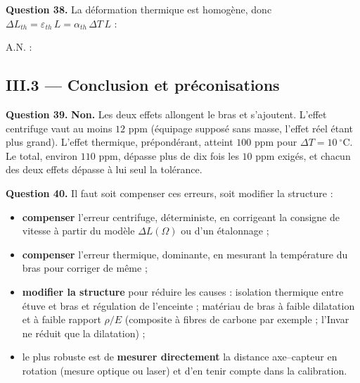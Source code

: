 \documentclass[11pt,a4paper]{article}
\providecommand{\tightlist}{\setlength{\itemsep}{0pt}\setlength{\parskip}{0pt}}
\newcommand{\equationajustee}[1]{%
  \sbox{\boiteequation}{$\displaystyle #1$}%
  \ifdim\wd\boiteequation>\linewidth
    \[\resizebox{\linewidth}{!}{\usebox{\boiteequation}}\]%
  \else
    \[#1\]%
  \fi}
\begin{document}
\textbf{Question 38.} La déformation thermique est homogène, donc \(\Delta L_{th} = \varepsilon_{th}\,L = \alpha_{th}\,\Delta T\,L\) :

\equationajustee{\boxed{e_{\Gamma th} = \alpha_{th}\,\Delta T}}

A.N. :

\equationajustee{\begin{aligned}
e_{\Gamma th} &= 10\times10^{-6}\times10\\
&= 1{,}0\times10^{-4} = 100\ \text{ppm}
\end{aligned}}

\hypertarget{iii.3-conclusion-et-pruxe9conisations}{%
\subsection{III.3 --- Conclusion et préconisations}\label{iii.3-conclusion-et-pruxe9conisations}}

\textbf{Question 39.} \textbf{Non.} Les deux effets allongent le bras et s'ajoutent. L'effet centrifuge vaut au moins \(12\) ppm (équipage supposé sans masse, l'effet réel étant plus grand). L'effet thermique, prépondérant, atteint \(100\) ppm pour \(\Delta T = 10\ ^\circ\text{C}\). Le total, environ \(110\) ppm, dépasse plus de dix fois les \(10\) ppm exigés, et chacun des deux effets dépasse à lui seul la tolérance.

\textbf{Question 40.} Il faut soit compenser ces erreurs, soit modifier la structure :

\begin{itemize}
\tightlist
\item
  \textbf{compenser} l'erreur centrifuge, déterministe, en corrigeant la consigne de vitesse à partir du modèle \(\Delta L(\Omega)\) ou d'un étalonnage ;
\item
  \textbf{compenser} l'erreur thermique, dominante, en mesurant la température du bras pour corriger de même ;
\item
  \textbf{modifier la structure} pour réduire les causes : isolation thermique entre étuve et bras et régulation de l'enceinte ; matériau de bras à faible dilatation et à faible rapport \(\rho/E\) (composite à fibres de carbone par exemple ; l'Invar ne réduit que la dilatation) ;
\item
  le plus robuste est de \textbf{mesurer directement} la distance axe--capteur en rotation (mesure optique ou laser) et d'en tenir compte dans la calibration.
\end{itemize}
\end{document}
